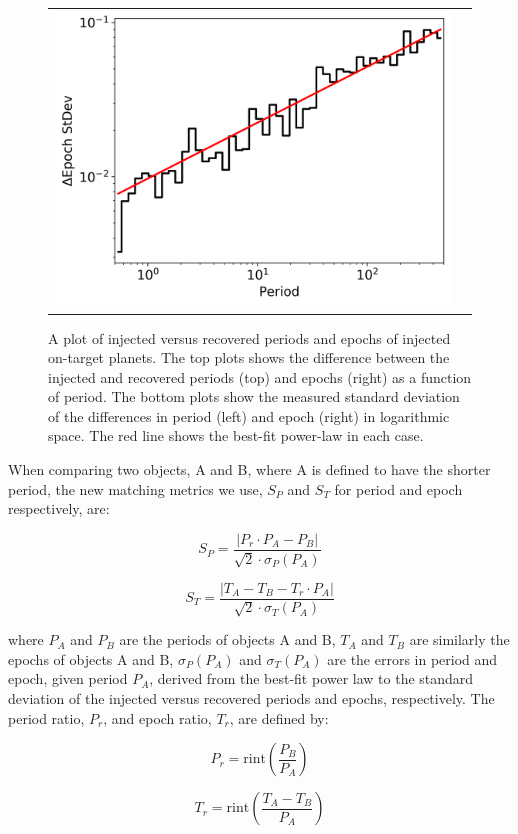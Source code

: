 \begin{figure}[ht]
\begin{tabular}{cc}
\includegraphics[width=0.5\linewidth]{INJ1-Ephem-Recovery-4.png}
\end{tabular}
\caption{A plot of injected versus recovered periods and epochs of injected on-target planets. The top plots shows the difference between the injected and recovered periods (top) and epochs (right) as a function of period. The bottom plots show the measured standard deviation of the differences in period (left) and epoch (right) in logarithmic space. The red line shows the best-fit power-law in each case.}
\label{injephemfig}
\end{figure}


When comparing two objects, A and B, where A is defined to have the shorter period, the new matching metrics we use, $S_{P}$ and $S_{T}$ for period and epoch respectively, are:

\begin{equation}
    S_{P} = \frac{\left|P_{r} \cdot P_{A} - P_{B}\right|}{\sqrt{2}\cdot\sigma_{P}(P_{A})}
\end{equation}

\begin{equation}
    S_{T} = \frac{\left| T_{A} - T_{B} - T_{r} \cdot P_{A}\right|}{\sqrt{2}\cdot\sigma_{T}(P_{A})}
\end{equation}

\noindent where $P_{A}$ and $P_{B}$ are the periods of objects A and B, $T_{A}$ and $T_{B}$ are similarly the epochs of objects A and B, $\sigma_{P}(P_{A})$ and $\sigma_{T}(P_{A})$ are the errors in period and epoch, given period $P_{A}$, derived from the best-fit power law to the standard deviation of the injected versus recovered periods and epochs, respectively. The period ratio, $P_{r}$, and epoch ratio, $T_{r}$, are defined by:

\begin{equation}
P_{r} = \textrm{rint}\left(\frac{P_{B}}{P_{A}}\right)
\end{equation}

\begin{equation}
T_{r} = \textrm{rint}\left(\frac{T_{A} - T_{B}}{P_{A}}\right)
\end{equation}


